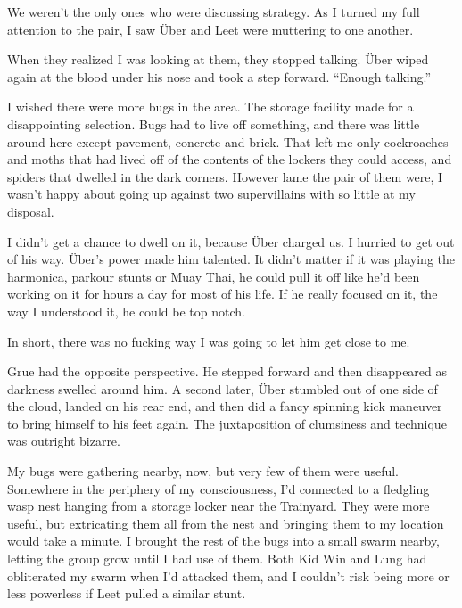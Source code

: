 





We weren't the only ones who were discussing strategy.  As I turned my full attention to the pair, I saw \"{U}ber and Leet were muttering to one another.



When they realized I was looking at them, they stopped talking.  \"{U}ber wiped again at the blood under his nose and took a step forward.  ``Enough talking.''



I wished there were more bugs in the area.  The storage facility made for a disappointing selection.  Bugs had to live off something, and there was little around here except pavement, concrete and brick.  That left me only cockroaches and moths that had lived off of the contents of the lockers they could access, and spiders that dwelled in the dark corners.  However lame the pair of them were, I wasn't happy about going up against two supervillains with so little at my disposal.



I didn't get a chance to dwell on it, because \"{U}ber charged us.  I hurried to get out of his way.  \"{U}ber's power made him talented.  It didn't matter if it was playing the harmonica, parkour stunts or Muay Thai, he could pull it off like he'd been working on it for hours a day for most of his life.  If he really focused on it, the way I understood it, he could be top notch.



In short, there was no fucking way I was going to let him get close to me.



Grue had the opposite perspective.  He stepped forward and then disappeared as darkness swelled around him.  A second later, \"{U}ber stumbled out of one side of the cloud, landed on his rear end, and then did a fancy spinning kick maneuver to bring himself to his feet again.  The juxtaposition of clumsiness and technique was outright bizarre.



My bugs were gathering nearby, now, but very few of them were useful.  Somewhere in the periphery of my consciousness, I'd connected to a fledgling wasp nest hanging from a storage locker near the Trainyard.  They were more useful, but extricating them all from the nest and bringing them to my location would take a minute.  I brought the rest of the bugs into a small swarm nearby, letting the group grow until I had use of them.  Both Kid Win and Lung had obliterated my swarm when I'd attacked them, and I couldn't risk being more or less powerless if Leet pulled a similar stunt.




